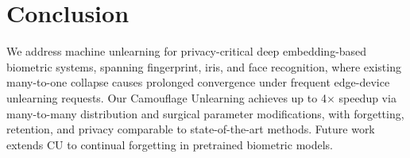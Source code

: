 \section{Conclusion}
We address machine unlearning for privacy-critical deep embedding-based biometric systems, spanning fingerprint, iris, and face recognition, where existing many-to-one collapse causes prolonged convergence under frequent edge-device unlearning requests. Our Camouflage Unlearning achieves up to 4$\times$ speedup via many-to-many distribution and surgical parameter modifications, with forgetting, retention, and privacy comparable to state-of-the-art methods. Future work extends CU to continual forgetting in pretrained biometric models.